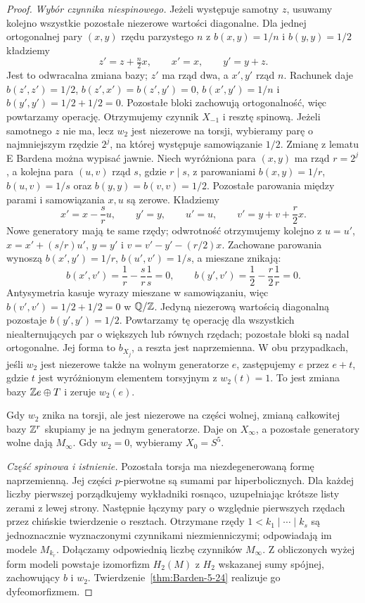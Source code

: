 \begin{proof}
\emph{Wybór czynnika niespinowego.}
Jeżeli występuje samotny $z$,
usuwamy kolejno wszystkie pozostałe
niezerowe wartości diagonalne.
Dla jednej ortogonalnej pary
$(x,y)$ rzędu parzystego $n$ z
$b(x,y)=1/n$ i $b(y,y)=1/2$
kładziemy
\[
 z'=z+\tfrac n2x,\qquad
 x'=x,\qquad y'=y+z.
\]
Jest to odwracalna zmiana bazy;
$z'$ ma rząd dwa, a $x',y'$ rząd $n$.
Rachunek daje
$b(z',z')=1/2$,
$b(z',x')=b(z',y')=0$,
$b(x',y')=1/n$ i
$b(y',y')=1/2+1/2=0$.
Pozostałe bloki zachowują
ortogonalność, więc powtarzamy
operację. Otrzymujemy czynnik
$X_{-1}$ i resztę spinową.
Jeżeli samotnego $z$ nie ma, lecz
$w_2$ jest niezerowe na torsji,
wybieramy parę o najmniejszym rzędzie
$2^j$, na której występuje
samowiązanie $1/2$. Zmianę z lematu E Bardena
można wypisać jawnie. Niech wyróżniona para $(x,y)$
ma rząd $r=2^j$, a kolejna para $(u,v)$ rząd $s$,
gdzie $r\mid s$, z parowaniami $b(x,y)=1/r$,
$b(u,v)=1/s$ oraz $b(y,y)=b(v,v)=1/2$.
Pozostałe parowania między parami i samowiązania
$x,u$ są zerowe. Kładziemy
\[
 x'=x-\frac{s}{r}u,\qquad y'=y,\qquad
 u'=u,\qquad v'=y+v+\frac r2x.
\]
Nowe generatory mają te same rzędy; odwrotność
otrzymujemy kolejno z $u=u'$, $x=x'+(s/r)u'$, $y=y'$
i $v=v'-y'-(r/2)x$. Zachowane parowania wynoszą
$b(x',y')=1/r$, $b(u',v')=1/s$, a mieszane znikają:
\[
 b(x',v')=\frac1r-\frac{s}{r}\frac1s=0,
 \qquad b(y',v')=\frac12-\frac r2\frac1r=0.
\]
Antysymetria kasuje wyrazy mieszane w samowiązaniu,
więc $b(v',v')=1/2+1/2=0$ w $\mathbb{Q}/\mathbb{Z}$.
Jedyną niezerową wartością diagonalną pozostaje
$b(y',y')=1/2$. Powtarzamy tę operację dla wszystkich
niealternujących par o większych lub równych rzędach;
pozostałe bloki są nadal ortogonalne.
Jej forma to $b_{X_j}$, a reszta
jest naprzemienna. W obu przypadkach,
jeśli $w_2$ jest niezerowe także na
wolnym generatorze $e$, zastępujemy
$e$ przez $e+t$, gdzie $t$ jest
wyróżnionym elementem torsyjnym
z $w_2(t)=1$. To jest zmiana bazy
$\mathbb{Z} e\oplus T$ i zeruje $w_2(e)$.

Gdy $w_2$ znika na torsji, ale jest
niezerowe na części wolnej,
zmianą całkowitej bazy $\mathbb{Z}^r$
skupiamy je na jednym generatorze.
Daje on $X_\infty$, a pozostałe
generatory wolne dają $M_\infty$.
Gdy $w_2=0$, wybieramy $X_0=S^5$.

\emph{Część spinowa i istnienie.}
Pozostała torsja ma niezdegenerowaną
formę naprzemienną. Jej części
$p$-pierwotne są sumami par
hiperbolicznych. Dla każdej liczby
pierwszej porządkujemy wykładniki
rosnąco, uzupełniając krótsze listy
zerami z lewej strony. Następnie
łączymy pary o względnie pierwszych
rzędach przez chińskie twierdzenie
o resztach. Otrzymane rzędy
$1<k_1\mid\cdots\mid k_s$
są jednoznacznie wyznaczonymi
czynnikami niezmienniczymi;
odpowiadają im modele $M_{k_r}$.
Dołączamy odpowiednią liczbę
czynników $M_\infty$.
Z obliczonych wyżej form modeli
powstaje izomorfizm $H_2(M)$
z $H_2$ wskazanej sumy spójnej,
zachowujący $b$ i $w_2$.
Twierdzenie~\ref{thm:Barden-5-24}
realizuje go dyfeomorfizmem.


\end{proof}
